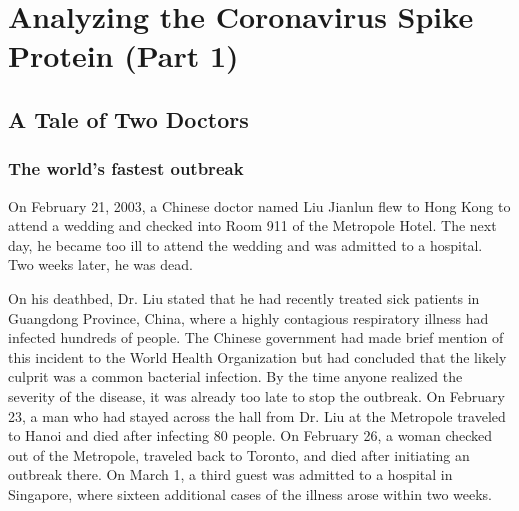 \chapter[Analyzing the Coronavirus Spike Protein (Part 1)]{Analyzing the Coronavirus Spike Protein (Part 1)}
\label{chapter:coronavirus_1}
\renewcommand{\chaptertitle}{Analyzing the Coronavirus Spike Protein (Part 1)}

\FloatBarrier

%

\section{A Tale of Two Doctors}
\label{sec:coronavirus_introduction}

\FloatBarrier
{}
\subsection{The world's fastest outbreak}

On February 21, 2003, a Chinese doctor named Liu Jianlun flew to Hong Kong to attend a wedding and checked into Room 911 of the Metropole Hotel. The next day, he became too ill to attend the wedding and was admitted to a hospital. Two weeks later, he was dead.

On his deathbed, Dr. Liu stated that he had recently treated sick patients in Guangdong Province, China, where a highly contagious respiratory illness had infected hundreds of people. The Chinese government had made brief mention of this incident to the World Health Organization but had concluded that the likely culprit was a common bacterial infection. By the time anyone realized the severity of the disease, it was already too late to stop the outbreak. On February 23, a man who had stayed across the hall from Dr. Liu at the Metropole traveled to Hanoi and died after infecting 80 people. On February 26, a woman checked out of the Metropole, traveled back to Toronto, and died after initiating an outbreak there. On March 1, a third guest was admitted to a hospital in Singapore, where sixteen additional cases of the illness arose within two weeks.

